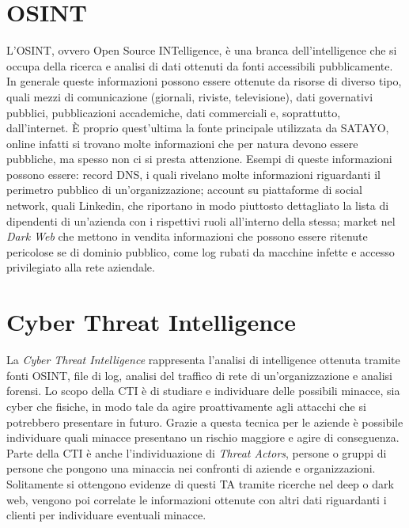 \section{OSINT}
\label{sec:osint}

L'OSINT\cite{GLASSMAN2012673}, ovvero Open Source INTelligence, è una branca
dell'intelligence che si occupa della ricerca e analisi di dati ottenuti da
fonti accessibili pubblicamente. In generale queste informazioni possono essere ottenute
da risorse di diverso tipo, quali mezzi di comunicazione (giornali, riviste, televisione),
dati governativi pubblici, pubblicazioni accademiche, dati commerciali e,
soprattutto, dall'internet. È proprio quest'ultima la fonte principale
utilizzata da SATAYO, online infatti si trovano molte informazioni che per natura
devono essere pubbliche, ma spesso non ci si presta attenzione. Esempi di queste
informazioni possono essere: record DNS, i quali rivelano molte informazioni riguardanti
il perimetro pubblico di un'organizzazione; account su piattaforme di social
network, quali Linkedin, che riportano in modo piuttosto dettagliato la lista di
dipendenti di un'azienda con i rispettivi ruoli all'interno della stessa; market
nel \textit{Dark Web} che mettono in vendita informazioni che possono essere
ritenute pericolose se di dominio pubblico, come log rubati da macchine infette e
accesso privilegiato alla rete aziendale.

\section{Cyber Threat Intelligence}
\label{sec:cti}

La \textit{Cyber Threat Intelligence}\cite{lee2023cyber} rappresenta l'analisi
di intelligence ottenuta tramite fonti OSINT, file di log, analisi del traffico
di rete di un'organizzazione e analisi forensi. Lo scopo della CTI è di studiare
e individuare delle possibili minacce, sia cyber che fisiche, in modo tale da agire
proattivamente agli attacchi che si potrebbero presentare in futuro. Grazie a
questa tecnica per le aziende è possibile individuare quali minacce presentano
un rischio maggiore e agire di conseguenza. Parte della CTI è anche l'individuazione
di \textit{Threat Actors}, persone o gruppi di persone che pongono una minaccia nei
confronti di aziende e organizzazioni. Solitamente si ottengono evidenze di
questi TA tramite ricerche nel deep o dark web, vengono poi correlate le informazioni
ottenute con altri dati riguardanti i clienti per individuare eventuali minacce.